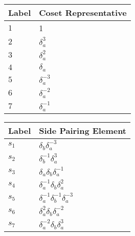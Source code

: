 \documentclass{article}
\begin{document}

\begin{center}
\begin{tabular}{ll}
\toprule
Label & Coset Representative\\
\midrule
$1$ & 1 \\
$2$ & $\delta_a^{3}$ \\
$3$ & $\delta_a^{2}$ \\
$4$ & $\delta_a^{}$ \\
$5$ & $\delta_a^{-3}$ \\
$6$ & $\delta_a^{-2}$ \\
$7$ & $\delta_a^{-1}$ \\
\bottomrule
\end{tabular}
\hfill
\begin{tabular}{ll}
\toprule
Label & Side Pairing Element\\
\midrule
$s_{1}$ & $\delta_b^{}\delta_a^{-3}$ \\
$s_{2}$ & $\delta_b^{-1}\delta_a^{3}$ \\
$s_{3}$ & $\delta_a^{}\delta_b^{}\delta_a^{-1}$ \\
$s_{4}$ & $\delta_a^{-1}\delta_b^{}\delta_a^{2}$ \\
$s_{5}$ & $\delta_a^{-1}\delta_b^{-1}\delta_a^{-3}$ \\
$s_{6}$ & $\delta_a^{2}\delta_b^{}\delta_a^{-2}$ \\
$s_{7}$ & $\delta_a^{-2}\delta_b^{}\delta_a^{3}$ \\
\bottomrule
\end{tabular}
\end{center}

\thispagestyle{empty}
\end{document}
